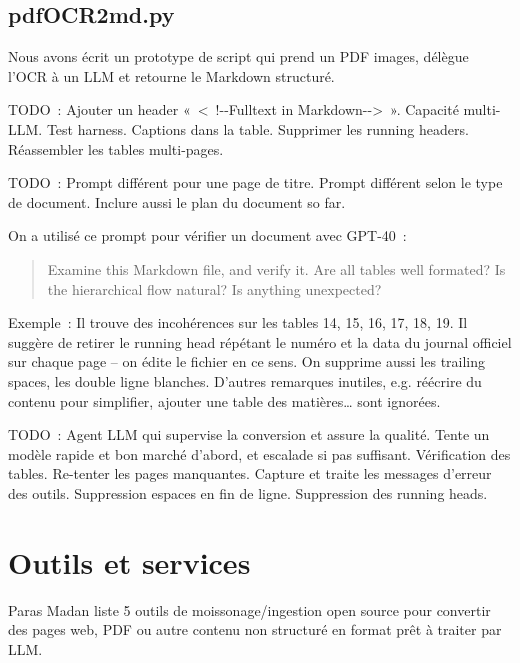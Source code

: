 \documentclass[a4paper,11pt]{report}
\begin{document}
\subsection{pdfOCR2md.py}\label{pdfocr2md.py}

Nous avons écrit un prototype de script qui prend un PDF images, délègue l'OCR à un LLM et retourne le Markdown structuré.

TODO~: Ajouter un header «~\textless~!-\/-Fulltext in Markdown-\/-\textgreater~». Capacité multi-LLM. Test harness. Captions dans la table. Supprimer les running headers. Réassembler les tables multi-pages.

TODO~: Prompt différent pour une page de titre. Prompt différent selon le type de document. Inclure aussi le plan du document so far.

On a utilisé ce prompt pour vérifier un document avec GPT-40~:

\begin{quote}
Examine this Markdown file, and verify it. Are all tables well formated? Is the hierarchical flow natural? Is anything unexpected?
\end{quote}

Exemple~: Il trouve des incohérences sur les tables 14, 15, 16, 17, 18, 19. Il suggère de retirer le running head répétant le numéro et la data du journal officiel sur chaque page -- on édite le fichier en ce sens. On supprime aussi les trailing spaces, les double ligne blanches. D'autres remarques inutiles, e.g. réécrire du contenu pour simplifier, ajouter une table des matières\ldots{} sont ignorées.

TODO~: Agent LLM qui supervise la conversion et assure la qualité. Tente un modèle rapide et bon marché d'abord, et escalade si pas suffisant. Vérification des tables. Re-tenter les pages manquantes. Capture et traite les messages d'erreur des outils. Suppression espaces en fin de ligne. Suppression des running heads.

\section{Outils et services}\label{outils-et-services}

Paras Madan \citep{QMIERWZB} liste 5 outils de moissonage/ingestion open source pour convertir des pages web, PDF ou autre contenu non structuré en format prêt à traiter par LLM.
\end{document}
